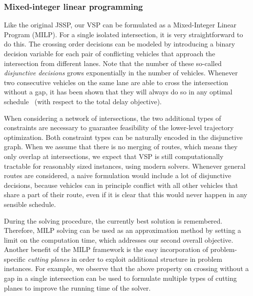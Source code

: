 \documentclass[notitlepage]{report}
\begin{document}

\subsubsection*{Mixed-integer linear programming}

Like the original JSSP, our VSP can be formulated as a Mixed-Integer Linear
Program (MILP).
For a single isolated intersection, it is very straightforward to do this. The
crossing order decisions can be modeled by introducing a binary decision
variable for each pair of conflicting vehicles that approach the intersection
from different lanes. Note that the number of these so-called
\textit{disjunctive decisions} grows exponentially in the number of vehicles.
Whenever two consecutive vehicles on the same lane are able to cross the
intersection without a gap, it has been shown that they will always do so in any
optimal schedule~\cite{limpensOnlinePlatoonForming2023} (with respect to the
total delay objective).

When considering a network of intersections, the two additional types of constraints
are necessary to guarantee feasibility of the lower-level trajectory
optimization.
Both constraint types can be naturally encoded in the disjunctive graph.
%
When we assume that there is no merging of routes, which means they only overlap
at intersections, we expect that VSP is still computationally tractable for
reasonably sized instances, using modern solvers. Whenever general routes
are considered, a naive formulation would include a lot of disjunctive
decisions, because vehicles can in principle conflict with all other vehicles
that share a part of their route, even if it is clear that this would never
happen in any sensible schedule.

During the solving procedure, the currently best solution is remembered.
Therefore, MILP solving can be used as an approximation method by setting a
limit on the computation time, which addresses our second overall objective.
%
Another benefit of the MILP framework is the easy incorporation of
problem-specific \textit{cutting planes} in order to exploit additional
structure in problem instances. For example, we observe that the above property
on crossing without a gap in a single intersection can be used to formulate
multiple types of cutting planes to improve the running time of the solver.
\end{document}
